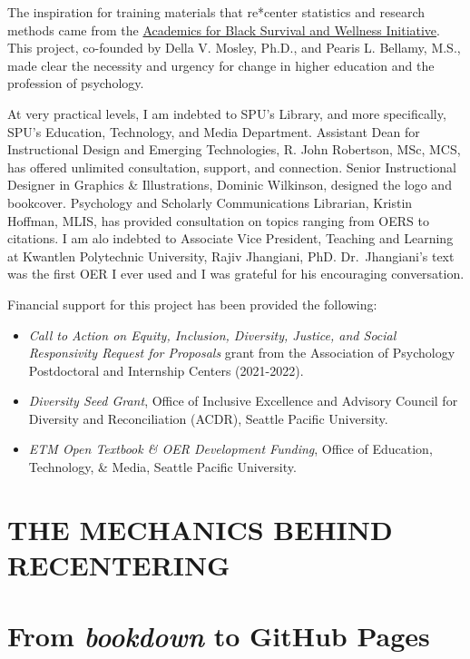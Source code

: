 \documentclass[
]{book}
\providecommand{\tightlist}{%
  \setlength{\itemsep}{0pt}\setlength{\parskip}{0pt}}
\begin{document}
The inspiration for training materials that re*center statistics and research methods came from the \href{https://www.academics4blacklives.com/}{Academics for Black Survival and Wellness Initiative}. This project, co-founded by Della V. Mosley, Ph.D., and Pearis L. Bellamy, M.S., made clear the necessity and urgency for change in higher education and the profession of psychology.

At very practical levels, I am indebted to SPU's Library, and more specifically, SPU's Education, Technology, and Media Department. Assistant Dean for Instructional Design and Emerging Technologies, R. John Robertson, MSc, MCS, has offered unlimited consultation, support, and connection. Senior Instructional Designer in Graphics \& Illustrations, Dominic Wilkinson, designed the logo and bookcover. Psychology and Scholarly Communications Librarian, Kristin Hoffman, MLIS, has provided consultation on topics ranging from OERS to citations. I am alo indebted to Associate Vice President, Teaching and Learning at Kwantlen Polytechnic University, Rajiv Jhangiani, PhD. Dr.~Jhangiani's text \citeyearpar{jhangiani_research_2019} was the first OER I ever used and I was grateful for his encouraging conversation.

Financial support for this project has been provided the following:

\begin{itemize}
\tightlist
\item
  \emph{Call to Action on Equity, Inclusion, Diversity, Justice, and Social Responsivity Request for Proposals} grant from the Association of Psychology Postdoctoral and Internship Centers (2021-2022).
\item
  \emph{Diversity Seed Grant}, Office of Inclusive Excellence and Advisory Council for Diversity and Reconciliation (ACDR), Seattle Pacific University.
\item
  \emph{ETM Open Textbook \& OER Development Funding}, Office of Education, Technology, \& Media, Seattle Pacific University.
\end{itemize}

\hypertarget{the-mechanics-behind-recentering}{%
\chapter*{THE MECHANICS BEHIND RECENTERING}\label{the-mechanics-behind-recentering}}

\hypertarget{book1}{%
\chapter{\texorpdfstring{From \emph{bookdown} to GitHub Pages}{From bookdown to GitHub Pages}}\label{book1}}
\end{document}
